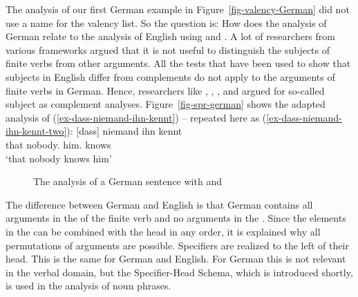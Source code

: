 The analysis of our first German example in Figure~\ref{fig-valency-German} did not use a name
for the valency list. So the question is: How does the analysis of German relate to the analysis of
English using \spr and \comps. A lot of researchers from various frameworks argued that it is not
useful to distinguish the subjects of finite verbs from other arguments. All the tests that have
been used to show that subjects in English differ from complements do not apply to the arguments of
finite verbs in German. Hence, researchers like \citet{Pollard90a}, \citet{Haider93a}, 
\citet[]{Eisenberg94b}, and \citet{Kiss95a} argued for so-called subject as complement
analyses. Figure~\vref{fig-spr-german} shows the adapted analysis of
(\ref{ex-dass-niemand-ihn-kennt}) -- repeated here as
(\ref{ex-dass-niemand-ihn-kennt-two}):
\ea
\label{ex-dass-niemand-ihn-kennt-two}
\gll  {}[dass] niemand ihn kennt\\
      \spacebr{}that nobody.\nom{} him.\acc{} knows\\ 
\glt `that nobody knows him'
\z
\begin{figure}
\caption{\label{fig-spr-german}The analysis of a German sentence with \spr and \compsl}
\end{figure}
The difference between German and English is that German contains all arguments in the \compsl of
the finite verb and no arguments in the \sprl. Since the elements in the \compsl can be combined
with the head in any order, it is explained why all permutations of arguments are
possible. Specifiers are realized to the left of their head. This is the same for German and
English. For German this is not relevant in the verbal domain, but the Specifier-Head Schema, which
is introduced shortly, is used in the analysis of noun phrases.

